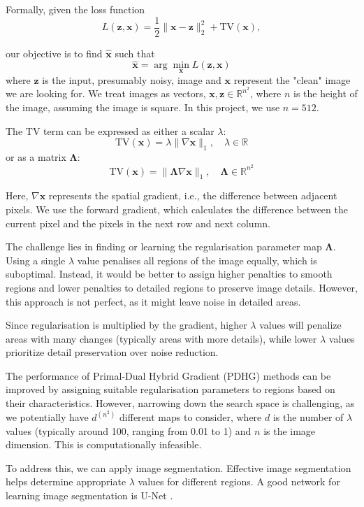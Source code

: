 \documentclass[12pt]{article}
\begin{document}
Formally, given the loss function
\vspace{-3pt}
$$ L(\mathbf{z}, \mathbf{x}) = \frac{1}{2} \| \mathbf{x} - \mathbf{z} \|_2^2 + \text{TV}(\mathbf{x}), $$

our objective is to find $\hat{\mathbf{x}}$ such that
$$ \hat{\mathbf{x}} = \arg \min_{\mathbf{x}} L(\mathbf{z}, \mathbf{x}) $$
where $\mathbf{z}$ is the input, presumably noisy, image and $\mathbf{x}$ represent the "clean" image we are looking for. We treat images as vectors, $\mathbf{x}, \mathbf{z} \in \mathbb{R}^{n^2}$, where $n$ is the height of the image, assuming the image is square. In this project, we use $n = 512$.

 The $\text{TV}$ term can be expressed as either a scalar $\lambda$:
$$
\text{TV}(\mathbf{x}) = \lambda \| \nabla \mathbf{x} \|_1, \quad \lambda \in \mathbb{R}
$$
or as a matrix $\mathbf{\Lambda}$:
$$
\text{TV}(\mathbf{x}) = \| \mathbf{\Lambda} \nabla \mathbf{x} \|_1, \quad \mathbf{\Lambda} \in \mathbb{R}^{n^2}
$$

Here, $\nabla \mathbf{x}$ represents the spatial gradient, i.e., the difference between adjacent pixels. We use the forward gradient, which calculates the difference between the current pixel and the pixels in the next row and next column.

The challenge lies in finding or learning the regularisation parameter map $\mathbf{\Lambda}$. Using a single $\lambda$ value penalises all regions of the image equally, which is suboptimal. Instead, it would be better to assign higher penalties to smooth regions and lower penalties to detailed regions to preserve image details. However, this approach is not perfect, as it might leave noise in detailed areas.

Since regularisation is multiplied by the gradient, higher $\lambda$ values will penalize areas with many changes (typically areas with more details), while lower $\lambda$ values prioritize detail preservation over noise reduction.

The performance of Primal-Dual Hybrid Gradient (PDHG) methods can be improved by assigning suitable regularisation parameters to regions based on their characteristics. However, narrowing down the search space is challenging, as we potentially have $d^{(n^2)}$ different maps to consider, where $d$ is the number of $\lambda$ values (typically around 100, ranging from 0.01 to 1) and $n$ is the image dimension. This is computationally infeasible.

To address this, we can apply image segmentation. Effective image segmentation helps determine appropriate $\lambda$ values for different regions. A good network for learning image segmentation is U-Net \cite{ronneberger2015unet}.
\end{document}
